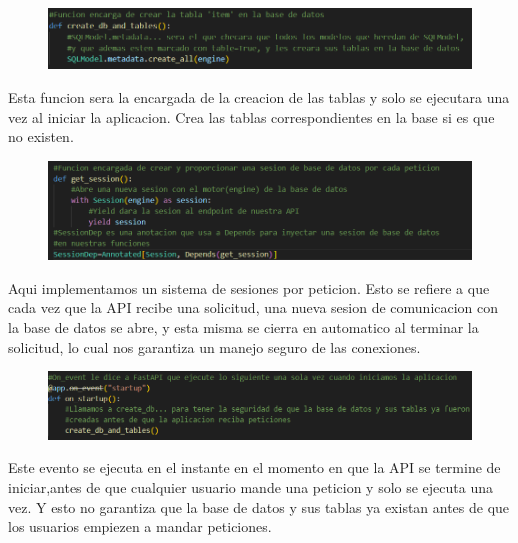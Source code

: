 \documentclass[12pt]{article}
\begin{document}
\begin{figure}[h!]
    \centering
    \includegraphics[width=1\textwidth]{Imagenes/Imagen WEB 3_5.png}
\end{figure}

Esta funcion sera la encargada de la creacion de las tablas y solo se ejecutara una vez al iniciar la aplicacion.
Crea las tablas correspondientes en la base si es que no existen.

\begin{figure}[h!]
    \centering
    \includegraphics[width=1\textwidth]{Imagenes/Imagen WEB 3_6.png}
\end{figure}

Aqui implementamos un sistema de sesiones por peticion. Esto se refiere a que cada vez que la API recibe una solicitud, una nueva sesion de comunicacion con la base de datos
se abre, y esta misma se cierra en automatico al terminar la solicitud, lo cual nos garantiza un manejo seguro de las conexiones.

\begin{figure}[H]
    \centering
    \includegraphics[width=1\textwidth]{Imagenes/Imagen WEB 3_7.png}
\end{figure}

Este evento se ejecuta en el instante en el momento en que la API se termine de iniciar,antes de que cualquier usuario mande una peticion y solo se ejecuta una vez.
Y esto no garantiza que la base de datos y sus tablas ya existan antes de que los usuarios empiezen a mandar peticiones.

\newpage %
\end{document}
